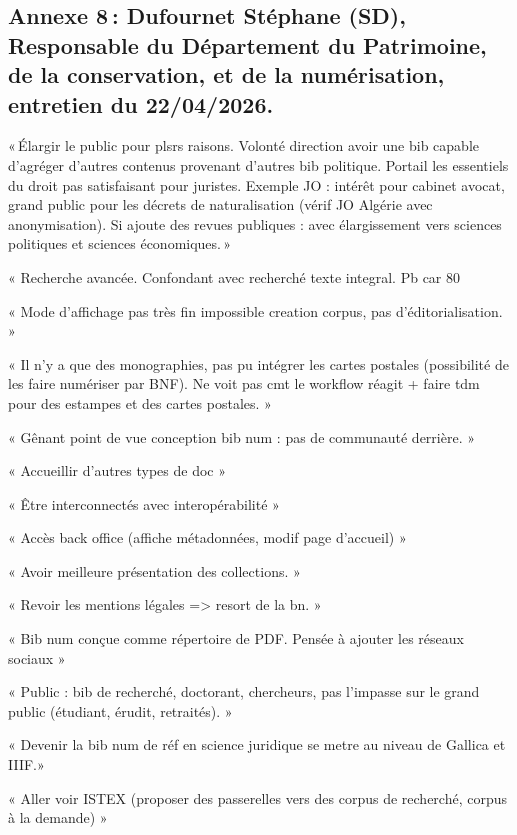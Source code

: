 \subsection*{Annexe 8 : Dufournet Stéphane (SD), Responsable du Département du Patrimoine, de la conservation, et de la numérisation, entretien du 22/04/2026.} 


« Élargir le public pour plsrs raisons. Volonté direction avoir une bib capable d’agréger d’autres contenus provenant d’autres bib politique. Portail les essentiels du droit pas satisfaisant pour juristes. Exemple JO : intérêt pour cabinet avocat, grand public pour les décrets de naturalisation (vérif JO Algérie avec anonymisation). Si ajoute des revues publiques : avec élargissement vers sciences politiques et sciences économiques. » 

« Recherche avancée. Confondant avec recherché texte integral. Pb car 80%

« Mode d’affichage pas très fin impossible creation corpus, pas d’éditorialisation. » 

« Il n’y a que des monographies, pas pu intégrer les cartes postales (possibilité de les faire numériser par BNF). Ne voit pas cmt le workflow réagit + faire tdm pour des estampes et des cartes postales. » 

« Gênant point de vue conception bib num : pas de communauté derrière. » 

« Accueillir d’autres types de doc » 

« Être interconnectés avec interopérabilité » 

« Accès back office (affiche métadonnées, modif page d’accueil) » 

« Avoir meilleure présentation des collections. » 

« Revoir les mentions légales => resort de la bn. » 

« Bib num conçue comme répertoire de PDF. Pensée à ajouter les réseaux sociaux » 

« Public : bib de recherché, doctorant, chercheurs, pas l’impasse sur le grand public (étudiant, érudit, retraités). » 

« Devenir la bib num de réf en science juridique se metre au niveau de Gallica et IIIF.» 

« Aller voir ISTEX (proposer des passerelles vers des corpus de recherché, corpus à la demande) » 

